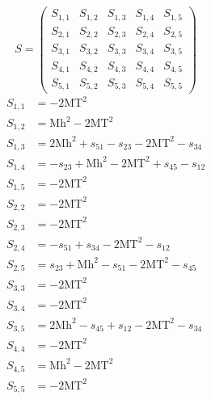 \documentclass[a4paper]{article}
\begin{document}
\begin{equation}
S=\left(\begin{array}{ccccc}
   S_{1,1}&
   S_{1,2}&
   S_{1,3}&
   S_{1,4}&
   S_{1,5}\\
   S_{2,1}&
   S_{2,2}&
   S_{2,3}&
   S_{2,4}&
   S_{2,5}\\
   S_{3,1}&
   S_{3,2}&
   S_{3,3}&
   S_{3,4}&
   S_{3,5}\\
   S_{4,1}&
   S_{4,2}&
   S_{4,3}&
   S_{4,4}&
   S_{4,5}\\
   S_{5,1}&
   S_{5,2}&
   S_{5,3}&
   S_{5,4}&
   S_{5,5}\end{array}\right)
\end{equation}
\begin{subequations}
\begin{align}
   S_{1,1}&=-2\text{MT}^2\\
   S_{1,2}&=\text{Mh}^2-2\text{MT}^2\\
   S_{1,3}&=2\text{Mh}^2+s_{51}-s_{23}-2\text{MT}^2-s_{34}\\
   S_{1,4}&=-s_{23}+\text{Mh}^2-2\text{MT}^2+s_{45}-s_{12}\\
   S_{1,5}&=-2\text{MT}^2\\
   S_{2,2}&=-2\text{MT}^2\\
   S_{2,3}&=-2\text{MT}^2\\
   S_{2,4}&=-s_{51}+s_{34}-2\text{MT}^2-s_{12}\\
   S_{2,5}&=s_{23}+\text{Mh}^2-s_{51}-2\text{MT}^2-s_{45}\\
   S_{3,3}&=-2\text{MT}^2\\
   S_{3,4}&=-2\text{MT}^2\\
   S_{3,5}&=2\text{Mh}^2-s_{45}+s_{12}-2\text{MT}^2-s_{34}\\
   S_{4,4}&=-2\text{MT}^2\\
   S_{4,5}&=\text{Mh}^2-2\text{MT}^2\\
   S_{5,5}&=-2\text{MT}^2
\end{align}
\end{subequations}
\end{document}
